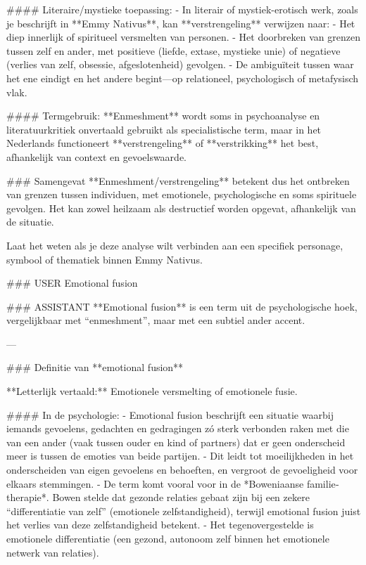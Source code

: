 \#\#\#\# Literaire/mystieke toepassing:
- In literair of mystiek-erotisch werk, zoals je beschrijft in **Emmy Nativus**, kan **verstrengeling** verwijzen naar:
- Het diep innerlijk of spiritueel versmelten van personen.
- Het doorbreken van grenzen tussen zelf en ander, met positieve (liefde, extase, mystieke unie) of negatieve (verlies van zelf, obsessie, afgeslotenheid) gevolgen.
- De ambiguïteit tussen waar het ene eindigt en het andere begint—op relationeel, psychologisch of metafysisch vlak.

\#\#\#\# Termgebruik:
**Enmeshment** wordt soms in psychoanalyse en literatuurkritiek onvertaald gebruikt als specialistische term, maar in het Nederlands functioneert **verstrengeling** of **verstrikking** het best, afhankelijk van context en gevoelswaarde.

\#\#\# Samengevat
**Enmeshment/verstrengeling** betekent dus het ontbreken van grenzen tussen individuen, met emotionele, psychologische en soms spirituele gevolgen. Het kan zowel heilzaam als destructief worden opgevat, afhankelijk van de situatie.

Laat het weten als je deze analyse wilt verbinden aan een specifiek personage, symbool of thematiek binnen Emmy Nativus.

\#\#\# USER
Emotional fusion

\#\#\# ASSISTANT
**Emotional fusion** is een term uit de psychologische hoek, vergelijkbaar met “enmeshment”, maar met een subtiel ander accent.

---

\#\#\# Definitie van **emotional fusion**

**Letterlijk vertaald:** Emotionele versmelting of emotionele fusie.

\#\#\#\# In de psychologie:
- Emotional fusion beschrijft een situatie waarbij iemands gevoelens, gedachten en gedragingen zó sterk verbonden raken met die van een ander (vaak tussen ouder en kind of partners) dat er geen onderscheid meer is tussen de emoties van beide partijen.
- Dit leidt tot moeilijkheden in het onderscheiden van eigen gevoelens en behoeften, en vergroot de gevoeligheid voor elkaars stemmingen.
- De term komt vooral voor in de *Boweniaanse familie­therapie*. Bowen stelde dat gezonde relaties gebaat zijn bij een zekere “differentiat­ie van zelf” (emotionele zelfstandigheid), terwijl emotional fusion juist het verlies van deze zelfstandigheid betekent.
- Het tegenovergestelde is emotionele differentiatie (een gezond, autonoom zelf binnen het emotionele netwerk van relaties).

